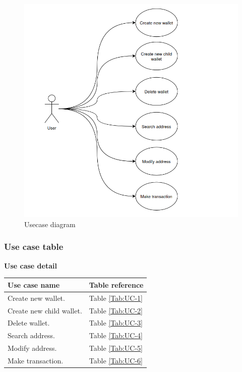\begin{figure}[ht!]
    \centering
    \includegraphics[width=1\textwidth]{images/usecases.png}
    \caption[Usecase diagram]{Usecase diagram}
    \label{fig:usecases}
\end{figure}

\newpage
\subsubsection{Use case table}

\bigskip
{\textbf{Use case detail}}

\begin{table}[b]
    \begin{tabular}{| m{8cm} | m{6cm} |}
        \hline
        Use case name            & Table reference      \\ \hline
        Create new wallet.       & Table \ref{Tab:UC-1} \\ \hline
        Create new child wallet. & Table \ref{Tab:UC-2} \\ \hline
        Delete wallet.           & Table \ref{Tab:UC-3} \\ \hline
        Search address.          & Table \ref{Tab:UC-4} \\ \hline
        Modify address.          & Table \ref{Tab:UC-5} \\ \hline
        Make transaction.        & Table \ref{Tab:UC-6} \\ \hline
    \end{tabular}
\end{table}
\clearpage

